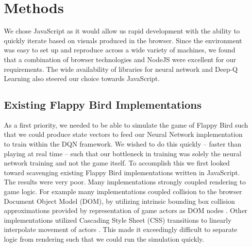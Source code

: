 \documentclass{chi2009}
\begin{document}
\section{Methods}

We chose JavaScript as it would allow us rapid development with the ability to quickly iterate based on visuals produced in the browser. Since the environment was easy to set up and reproduce across a wide variety of machines, we found that a combination of browser technologies and NodeJS were excellent for our requirements. The wide availability of libraries for neural network and Deep-Q Learning also steered our choice towards JavaScript.

\subsection{Existing Flappy Bird Implementations}

As a first priority, we needed to be able to simulate the game of Flappy Bird such that we could produce state vectors to feed our Neural Network implementation to train within the DQN framework. We wished to do this quickly -- faster than playing at real time -- such that our bottleneck in training was solely the neural network training and not the game itself. To accomplish this we first looked toward scavenging existing Flappy Bird implementations written in JavaScript. The results were very poor. Many implementations strongly coupled rendering to game logic. For example many implementations coupled collision to the browser Document Object Model (DOM), by utilizing intrinsic bounding box collision approximations provided by representation of game actors as DOM nodes \cite{floppybird}. Other implementations utilized Cascading Style Sheet (CSS) transitions to linearly interpolate movement of actors \cite{clumsybird}. This made it exceedingly difficult to separate logic from rendering such that we could run the simulation quickly.
\end{document}
